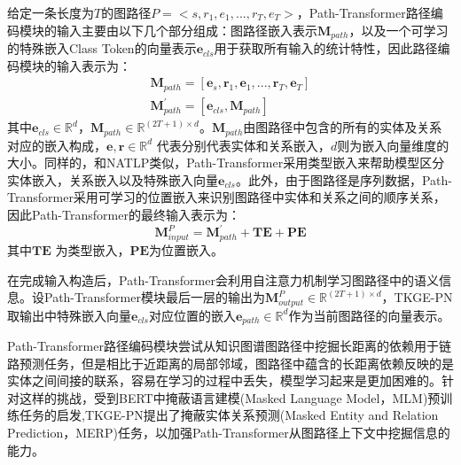 给定一条长度为$T$的图路径$P=<s,r_1,e_1,...,r_T,e_T>$，Path-Transformer路径编码模块的输入主要由以下几个部分组成：图路径嵌入表示$\mathbf{M}_{path} $，以及一个可学习的特殊嵌入Class Token的向量表示$\mathbf{e}_{cls}$用于获取所有输入的统计特性，因此路径编码模块的输入表示为：
\begin{gather}
  \mathbf{M}_{path} = [\boldsymbol{e}_s,\boldsymbol{r}_1,\boldsymbol{e}_1,...,\boldsymbol{r}_T,\boldsymbol{e}_T]\\
  \mathbf{M}_{path}^{\prime} = [\boldsymbol{e}_{cls},\mathbf{M}_{path}]
\end{gather}
其中$\boldsymbol{e}_{cls}\in\mathbb{R}^d$，$\mathbf{M}_{path} \in \mathbb{R}^{(2T+1)\times d}$。$\mathbf{M}_{path}$由图路径中包含的所有的实体及关系对应的嵌入构成，$\boldsymbol{e},\boldsymbol{r} \in \mathbb{R}^d$ 代表分别代表实体和关系嵌入，$d$则为嵌入向量维度的大小。同样的，和NATLP类似，Path-Transformer采用类型嵌入来帮助模型区分实体嵌入，关系嵌入以及特殊嵌入向量$\boldsymbol{e}_{cls}$。此外，由于图路径是序列数据，Path-Transformer采用可学习的位置嵌入来识别图路径中实体和关系之间的顺序关系，因此Path-Transformer的最终输入表示为：
\begin{equation}
  \mathbf{M}_{input}^{P} = \mathbf{M}_{path}^{\prime}+\mathbf{TE} + \mathbf{PE}
\end{equation}
其中$\mathbf{TE}$ 为类型嵌入，$\mathbf{PE}$为位置嵌入。

在完成输入构造后，Path-Transformer会利用自注意力机制学习图路径中的语义信息。设Path-Transformer模块最后一层的输出为$\mathbf{M}_{output}^{P}\in\mathbb{R}^{(2T+1)\times d}$，TKGE-PN取输出中特殊嵌入向量$\boldsymbol{e}_{cls}$对应位置的嵌入$\boldsymbol{e}_{path}\in\mathbb{R}^d$作为当前图路径的向量表示。

Path-Transformer路径编码模块尝试从知识图谱图路径中挖掘长距离的依赖用于链路预测任务，但是相比于近距离的局部邻域，图路径中蕴含的长距离依赖反映的是实体之间间接的联系，容易在学习的过程中丢失，模型学习起来是更加困难的。针对这样的挑战，受到BERT中掩蔽语言建模(Masked Language Model，MLM)预训练任务的启发,TKGE-PN提出了掩蔽实体关系预测(Masked Entity and Relation Prediction，MERP)任务，以加强Path-Transformer从图路径上下文中挖掘信息的能力。

